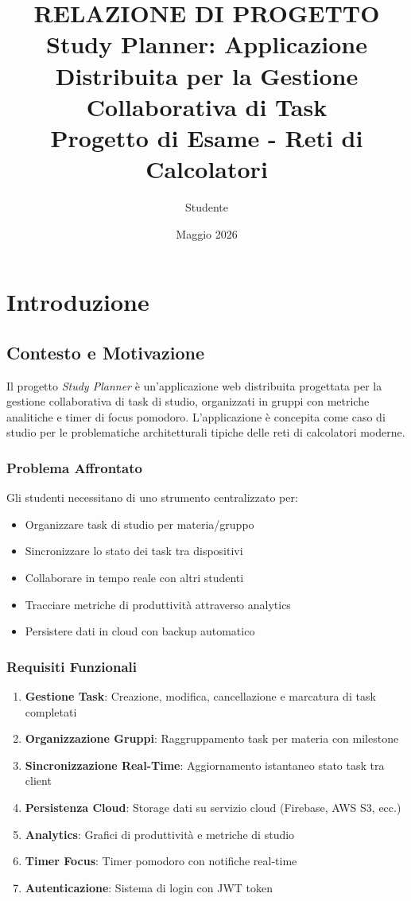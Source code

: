 \documentclass[12pt,a4paper]{report}
\title{
    \textbf{RELAZIONE DI PROGETTO}\\[0.5cm]
    \Large Study Planner: Applicazione Distribuita per la Gestione Collaborativa di Task\\[0.3cm]
    \normalsize Progetto di Esame - Reti di Calcolatori
}
\author{Studente}
\date{Maggio 2026}
\begin{document}
\maketitle

\tableofcontents
\newpage

\chapter{Introduzione}

\section{Contesto e Motivazione}

Il progetto \textit{Study Planner} è un'applicazione web distribuita progettata per la gestione collaborativa di task di studio, organizzati in gruppi con metriche analitiche e timer di focus pomodoro. L'applicazione è concepita come caso di studio per le problematiche architetturali tipiche delle reti di calcolatori moderne.

\subsection{Problema Affrontato}

Gli studenti necessitano di uno strumento centralizzato per:
\begin{itemize}
    \item Organizzare task di studio per materia/gruppo
    \item Sincronizzare lo stato dei task tra dispositivi
    \item Collaborare in tempo reale con altri studenti
    \item Tracciare metriche di produttività attraverso analytics
    \item Persistere dati in cloud con backup automatico
\end{itemize}

\subsection{Requisiti Funzionali}

\begin{enumerate}
    \item \textbf{Gestione Task}: Creazione, modifica, cancellazione e marcatura di task completati
    \item \textbf{Organizzazione Gruppi}: Raggruppamento task per materia con milestone
    \item \textbf{Sincronizzazione Real-Time}: Aggiornamento istantaneo stato task tra client
    \item \textbf{Persistenza Cloud}: Storage dati su servizio cloud (Firebase, AWS S3, ecc.)
    \item \textbf{Analytics}: Grafici di produttività e metriche di studio
    \item \textbf{Timer Focus}: Timer pomodoro con notifiche real-time
    \item \textbf{Autenticazione}: Sistema di login con JWT token
\end{enumerate}
\end{document}
